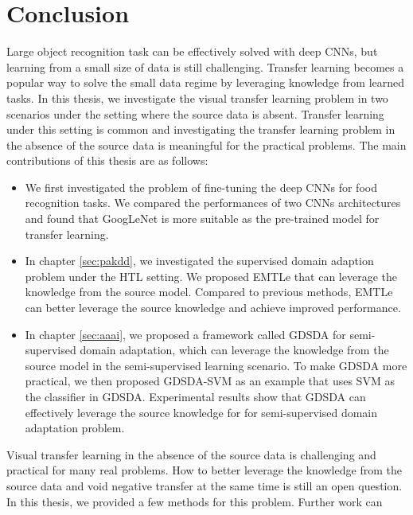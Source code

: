\chapter{Conclusion}
Large object recognition task can be effectively solved with deep CNNs, but learning from a small size of data is still challenging. Transfer learning becomes a popular way to solve the small data regime by leveraging knowledge from learned tasks. 
In this thesis, we investigate the visual transfer learning problem in two scenarios under the setting where the source data is absent. Transfer learning under this setting is common and investigating the transfer learning problem in the absence of the source data is meaningful for the practical problems. The main contributions of this thesis are as follows:
\begin{itemize}
	\item We first investigated the problem of fine-tuning the deep CNNs for food recognition tasks. We compared the performances of two CNNs architectures and found that GoogLeNet is more suitable as the pre-trained model for transfer learning.
	\item In chapter \ref{sec:pakdd}, we investigated the supervised domain adaption problem under the HTL setting. We proposed EMTLe that can leverage the knowledge from the source model. Compared to previous methods, EMTLe can better leverage the source knowledge and achieve improved performance.
	\item In chapter \ref{sec:aaai}, we proposed a framework called GDSDA for semi-supervised domain adaptation, which can leverage the knowledge from the source model in the semi-supervised learning scenario. To make GDSDA more practical, we then proposed GDSDA-SVM as an example that uses SVM as the classifier in GDSDA. Experimental results show that GDSDA can effectively leverage the source knowledge for for semi-supervised domain adaptation problem. 
\end{itemize}

Visual transfer learning in the absence of the source data is challenging and practical for many real problems. How to better leverage the knowledge from the source data and void negative transfer at the same time is still an open question. In this thesis, we provided a few methods for this problem. Further work can 